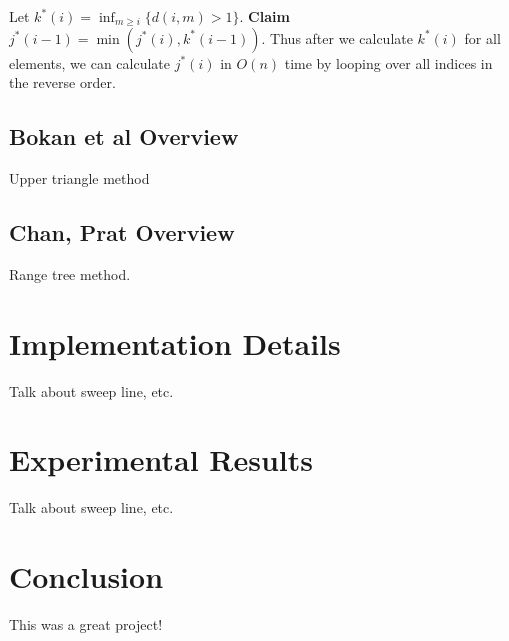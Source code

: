 \documentclass{article}
\begin{document}
Let $k^*(i) = \inf_{m \geq i} \{d(i, m) > 1\}$. \textbf{Claim} $j^*(i-1) = \min(j^*(i), k^*(i-1))$. Thus after we calculate $k^*(i)$ for all elements, we can calculate $j^*(i)$ in $O(n)$ time by looping over all indices in the reverse order.

\subsection{Bokan et al Overview}
Upper triangle method

\subsection{Chan, Prat Overview}
Range tree method.

\section{Implementation Details}
Talk about sweep line, etc.

\section{Experimental Results}
Talk about sweep line, etc.

\section{Conclusion}
This was a great project!



\end{document}
